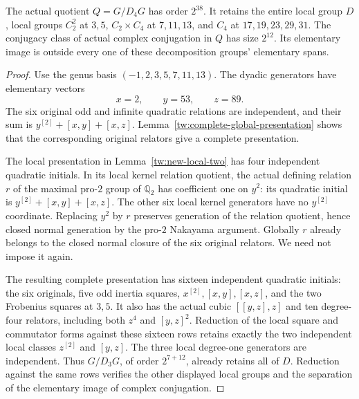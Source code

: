 \begin{lemma}\label{tw:new-retained-quotient}
The actual quotient $Q=G/D_4G$ has order $2^{38}$. It retains the
entire local group $D$, local groups $C_2^2$ at $3,5$,
$C_2\times C_4$ at $7,11,13$, and $C_4$ at
$17,19,23,29,31$. The conjugacy class of actual complex conjugation
in $Q$ has size $2^{12}$. Its elementary image is outside every one
of these decomposition groups' elementary spans.
\end{lemma}
\begin{proof}
Use the genus basis $(-1,2,3,5,7,11,13)$. The dyadic generators have
elementary vectors
\[
 x=2,\qquad y=53,\qquad z=89.
\]
The six original odd and infinite quadratic relations are independent,
and their sum is $y^{[2]}+[x,y]+[x,z]$.
Lemma~\ref{tw:complete-global-presentation} shows that the corresponding
original relators give a complete presentation.

The local presentation in Lemma~\ref{tw:new-local-two} has four
independent quadratic initials. In its local kernel relation quotient,
the actual defining relation $r$ of the maximal pro-$2$ group of
$\mathbb Q_2$ has coefficient one on $y^2$: its quadratic initial is
$y^{[2]}+[x,y]+[x,z]$. The other six local kernel generators have no
$y^{[2]}$ coordinate. Replacing $y^2$ by $r$ preserves generation of
the relation quotient, hence closed normal generation by the pro-$2$
Nakayama argument. Globally $r$ already belongs to the closed normal
closure of the six original relators. We need not impose it
again.

The resulting complete presentation has sixteen independent quadratic
initials: the six originals, five odd inertia squares,
$x^{[2]},[x,y],[x,z]$, and the two Frobenius squares at $3,5$.
It also has the actual cubic $[[y,z],z]$ and ten degree-four relators,
including both $z^4$ and $[y,z]^2$. Reduction of the local square and
commutator forms against these sixteen rows retains exactly the two
independent local classes $z^{[2]}$ and $[y,z]$. The three local
degree-one generators are independent. Thus $G/D_3G$, of order
$2^{7+12}$, already retains all of $D$. Reduction against the same rows
verifies the other displayed local
groups and the separation of the elementary image of complex conjugation.


\end{proof}
